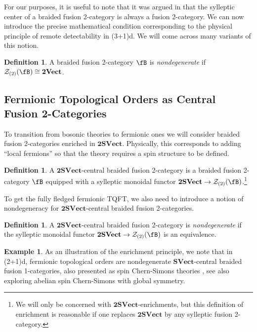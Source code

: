 \documentclass[11pt,reqno]{amsart}
\newcommand{\tVect}{\mathbf{2Vect}}
\newcommand{\SVect}{\mathbf{SVect}}
\newcommand{\tSVect}{\mathbf{2SVect}}
\newcommand{\cZ}{\mathcal{Z}}
\numberwithin{equation}{section}
\theoremstyle{plain}
\theoremstyle{definition}
\newtheorem{defn}[equation]{Definition}
\newtheorem{ex}[equation]{Example}
\begin{document}
For our purposes, it is useful to note that it was argued in \cite[Proposition 5.1.8]{xu2024higher} that the sylleptic center of a braided fusion 2-category is always a fusion 2-category. We can now introduce the precise mathematical condition corresponding to the physical principle of remote detectability in (3+1)d. We will come across many variants of this notion.

\begin{defn}\label{def:degeneracy}
A braided fusion 2-category $\fB$ is \textit{nondegenerate} if $\cZ_{(2)}(\fB)\cong \tVect$.
\end{defn}

\subsection{Fermionic Topological Orders as Central Fusion 2-Categories}\label{subsection:perlimFTO}
To transition from bosonic theories to fermionic ones we will consider braided fusion 2-categories enriched in $\tSVect$. Physically, this corresponds to adding ``local fermions'' so that the theory  requires a spin structure to be defined.

\begin{defn}
    A $\mathbf{2SVect}$-central braided fusion 2-category is a braided fusion 2-category $\fB$ equipped with a sylleptic monoidal functor $\tSVect \to \cZ_{(2)}(\fB)$.\footnote{We will only be concerned with $\tSVect$-enrichments, but this definition of enrichment is reasonable if one replaces $\tSVect$ by any sylleptic fusion 2-category.}
\end{defn}

To get the fully fledged fermionic TQFT, we also need to introduce a notion of nondegeneracy for $\mathbf{2SVect}$-central braided fusion 2-categories. 

\begin{defn}
A $\mathbf{2SVect}$-central braided fusion 2-category is \textit{nondegenerate} if the sylleptic monoidal functor $\tSVect \to \cZ_{(2)}(\fB)$ is an equivalence.
\end{defn}


\begin{ex}
    As an illustration of the enrichment principle, we note that in (2+1)d, fermionic topological orders are nondegenerate $\SVect$-central braided fusion 1-categories, also presented as spin Chern-Simons theories \cite{Dijkgraaf:1989pz,jenquin2006spin,Seiberg:2016rsg}, see also \cite{Delmastro:2019vnj,Debray:2023iwf} exploring abelian spin Chern-Simons with global symmetry.
\end{ex}
\end{document}
